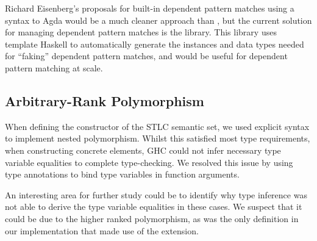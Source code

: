 Richard Eisenberg's proposals for built-in dependent pattern matches using a syntax to Agda would be a much cleaner approach than , but the current solution for managing dependent pattern matches is the  library. This library uses template Haskell to automatically generate the instances and data types needed for “faking” dependent pattern matches, and would be useful for dependent pattern matching at scale.

\subsection{Arbitrary-Rank Polymorphism}

When defining the  constructor of the STLC semantic set, we used explicit  syntax to implement nested polymorphism. Whilst this satisfied most type requirements, when constructing concrete  elements, GHC could not infer necessary type variable equalities to complete type-checking. We resolved this issue by using type annotations to bind type variables in function arguments. 

An interesting area for further study could be to identify why type inference was not able to derive the type variable equalities in these cases. We suspect that it could be due to the higher ranked polymorphism, as  was the only definition in our implementation that made use of the  extension.

